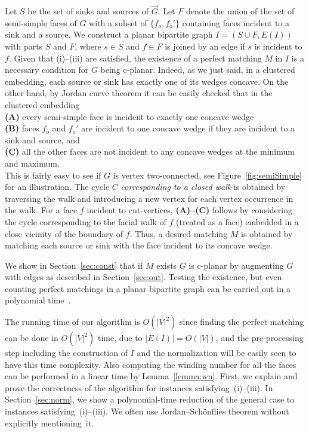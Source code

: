 \documentclass{llncs}
\begin{document}
Let  $S$ be the set of sinks and sources of $\overrightarrow{G}$. Let $F$ denote the union of the set of 
semi-simple faces of $G$ with a subset of $\{f_o,f_o'\}$ containing faces incident to a sink and a source.
We construct a planar bipartite graph $I=(S\cup F, E(I))$ with parts $S$ and $F$,
 where $s\in S$ and $f\in F$
is joined by an edge if $s$ is incident to $f$. 
Given that (i)--(iii) are satisfied, the existence of a perfect matching $M$ in $I$ is a necessary condition for $G$ being c-planar. Indeed, as we just said,
in a clustered embedding, each source or sink has exactly one of its wedges concave.
On the other hand, by Jordan curve theorem  it  can be easily checked that in the clustered embedding  \\
{\bf (A)} every semi-simple face is incident to exactly one concave wedge \\
{\bf (B)} faces $f_o$ and $f_o'$ are incident to one concave wedge if they are incident to a sink and source, and \\ {\bf (C)} all the other faces are not incident to any concave wedges at the minimum and maximum. \\
This is fairly easy to see if $G$ is vertex two-connected, see Figure~\ref{fig:semiSimple} for an illustration.
The cycle $C$ \emph{corresponding to a closed walk} is obtained
by traversing the walk and introducing a new vertex for each
vertex occurrence in the walk.
For a face $f$ incident to cut-vertices, {\bf (A)--(C)} follows by considering the cycle corresponding to the facial walk of $f$ (treated as a face) embedded in a close vicinity of the boundary of $f$. 
 Thus, a desired matching $M$ is obtained by matching each source or sink with
the face incident to its concave wedge.

 
We show in Section~\ref{sec:const}  that if $M$ exists $G$  is c-planar by augmenting 
$G$ with edges as described in Section~\ref{sec:out}.
Testing the existence, but even counting perfect matchings in a planar bipartite graph can be carried out in a polynomial time~\cite[Section 8]{L09}.



The running time of our algorithm is $O(|V|^2)$ since finding the perfect matching 
can be done in $O(|V|^2)$  time, due to $|E(I)|=O(|V|)$, and the pre-processing step including the construction of $I$ and the normalization will be easily seen to have this time complexity. Also computing the winding number for all the faces can be performed in a linear time by Lemma~\ref{lemma:wn}.
First, we explain and prove the correctness of the algorithm for
 instances satisfying~(i)--(iii). In Section~\ref{sec:norm},
 we show a polynomial-time reduction of the general case  to instances  satisfying~(i)--(iii). We often use Jordan--Sch\"onflies theorem without
 explicitly mentioning~it.
\end{document}
